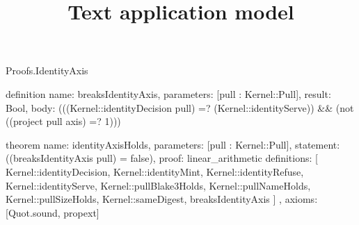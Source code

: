 \begin{lexlean}{Proofs.IdentityAxis}
\title{Text application model}
\begin{semanticmodule}
definition{
  name: breaksIdentityAxis,
  parameters: [pull : Kernel::Pull],
  result: Bool,
  body: (((Kernel::identityDecision pull) =? (Kernel::identityServe)) && (not ((project pull axis) =? 1)))
}

theorem{
  name: identityAxisHolds,
  parameters: [pull : Kernel::Pull],
  statement: ((breaksIdentityAxis pull) = false),
  proof: linear_arithmetic{
    definitions: [
      Kernel::identityDecision,
      Kernel::identityMint,
      Kernel::identityRefuse,
      Kernel::identityServe,
      Kernel::pullBlake3Holds,
      Kernel::pullNameHolds,
      Kernel::pullSizeHolds,
      Kernel::sameDigest,
      breaksIdentityAxis
    ]
  },
  axioms: [Quot.sound, propext]
}
\end{semanticmodule}
\end{lexlean}
